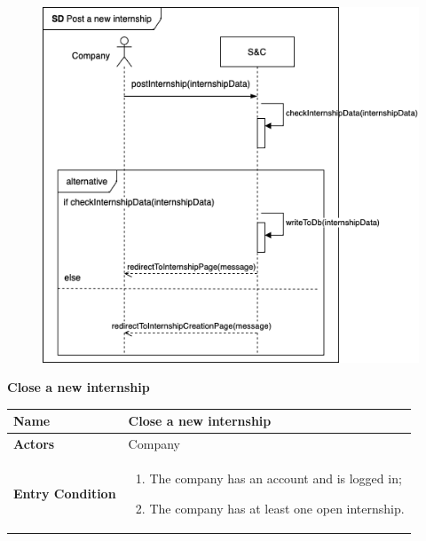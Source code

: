 \begin{enumerate}[label=\textbf{[US\arabic*]}, left = 0pt, align = left, resume]
\begin{longtable}{|l|p{11cm}|}
            \end{longtable}
\newpage
            \begin{figure}[h!]
                \centering        \includegraphics{RASD/Images/UseCases/PostNewInternship.drawio.png}
                \label{fig:example}
                \end{figure}
\newpage
            \newpage
            \item \textbf{Close a new internship}
            
            \begin{longtable}{|l|p{11cm}|}  
                \hline
                \textbf{Name} & 
                    \textbf{Close a new internship} \\
                \hline
                
                \textbf{Actors} & 
                    Company \\
                \hline
                
                \textbf{Entry Condition} & 
                    \begin{enumerate}[label=\textbullet, itemsep=0em]
                        \item The company has an account and is logged in;
                        \item The company has at least one open internship.
                    \end{enumerate} \\
                \hline 
                

\end{longtable}
\end{enumerate}
